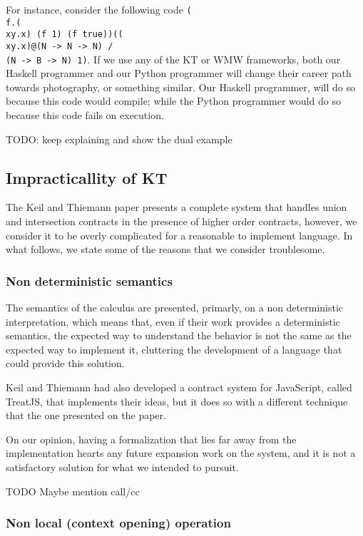For instance, consider the following code
\texttt{(\\f.(\\xy.x) (f 1) (f true))((\\xy.x)@(N -> N -> N) /\\ (N -> B -> N) 1)}.
If we use any of the KT or WMW frameworks, both our Haskell programmer and our
Python programmer will change their career path towards photography, or something
similar.
Our Haskell programmer, will do so because this code would compile;
while the Python programmer would do so because this code fails on execution.

TODO: keep explaining and show the dual example



\subsection{Impracticallity of KT}

The Keil and Thiemann paper presents a complete system that handles union and intersection
contracts in the presence of higher order contracts, however, we consider it to be overly
complicated for a reasonable to implement language.
In what follows, we state some of the reasons that we consider troublesome.

\subsubsection{Non deterministic semantics}

The semantics of the calculus are presented, primarly, on a non deterministic interpretation,
which means that, even if their work provides a deterministic semantics,
the expected way to understand
the behavior is not the same as the expected way to implement it, cluttering the development
of a language that could provide this solution.

Keil and Thiemann had also developed a contract system for JavaScript, called TreatJS, that
implements their ideas, but it does so with a different technique that the one presented
on the paper.

On our opinion, having a formalization that lies far away from the implementation
hearts any future expansion work on the system, and it is not a satisfactory solution
for what we intended to pursuit.


TODO Maybe mention call/cc

\subsubsection{Non local (context opening) operation}

